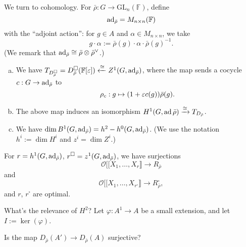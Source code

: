 \documentclass[reqno]{amsart} 
\numberwithin{theorem}{section}
\numberwithin{equation}{section}
\numberwithin{exercise}{section}
\begin{document}
We turn to cohomology.  For $\bar{\rho} : G \rightarrow \mathrm{GL}_n(\mathbb{F})$, define
\begin{equation*}
  \operatorname{ad}_{\bar{\rho}} = M_{n \times n}(\mathbb{F})
\end{equation*}
with the ``adjoint action'': for $g \in A$ and $\alpha \in M_{n \times n}$, we take
\begin{equation*}
  g \cdot \alpha := \bar{\rho}(g) \cdot \alpha \cdot \bar{\rho}(g)^{-1}.
\end{equation*}
(We remark that $\operatorname{ad}_{\bar{\rho}} \cong \bar{\rho} \otimes \bar{\rho}^\vee$.)
\begin{proposition}\label{proposition:cq6thpeed2}
  \begin{enumerate}[(a)]
  \item We have $T_{D_\rho^{\square}} = D_{\bar{\rho}}^{\square}(\mathbb{F}[\varepsilon]) \xleftarrow{\cong} Z^1(G, \operatorname{ad}_{\bar{\rho}})$, where the map sends a cocycle $c : G \rightarrow \operatorname{ad}_{\bar{\rho}}$ to
    \begin{equation*}
      \rho_c : g \mapsto(1 + \varepsilon c(g)) \bar{\rho}(g).
    \end{equation*}
  \item The above map induces an isomorphism $H^1(G, \operatorname{ad} \bar{\rho}) \xrightarrow{\cong} T_{D_{\bar{\rho}}}$.
  \item We have $\dim B^1(G, \operatorname{ad}_{\bar{\rho}}) = h^2 - h^0(G, \operatorname{ad}_{\bar{\rho}})$.  (We use the notation $h^i := \dim H^i$ and $z^i = \dim Z^i$.)
  \end{enumerate}
\end{proposition}
\begin{corollary}\label{corollary:cq6thpefo9}
  For $r = h^1(G, \operatorname{ad}_{\bar{\rho}})$, $r^{\square} = z^1(G, \operatorname{ad}_{\bar{\rho}})$, we have surjections
  \begin{equation*}
    \mathcal{O} [[ X_1, \dotsc, X_r \rrbracket \rightarrow R_{\bar{\rho}}
  \end{equation*}
  and
  \begin{equation*}
    \mathcal{O} [[ X_1, \dotsc, X_{r^{\square}} \rrbracket \rightarrow R_{\bar{\rho}}^{\square},
  \end{equation*}
  and $r$, $r^{\square}$ are optimal.
\end{corollary}
What's the relevance of $H^2$?  Let $\varphi : A^1 \rightarrow A$ be a small extension, and let $I := \ker(\varphi)$.
\begin{question}\label{question:cq6thpebye}
  Is the map $D_{\bar{\rho}}(A') \rightarrow D_{\bar{\rho}}(A)$ surjective?
\end{question}
\end{document}
